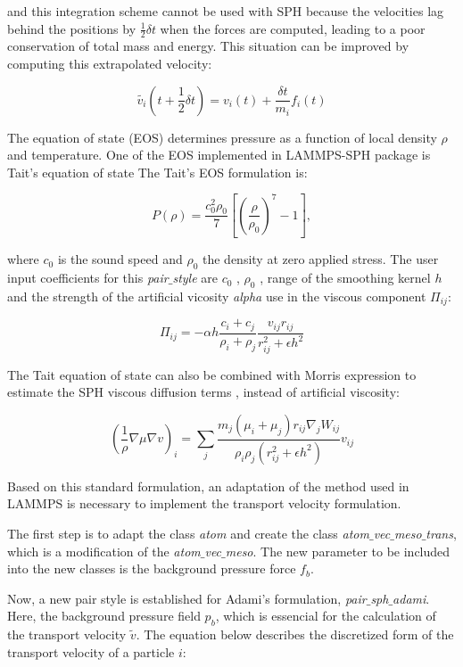 and this integration scheme cannot be used with SPH because the velocities lag behind the positions by $\frac{1}{2}\delta t$ when the forces are computed, leading to a poor conservation
of total mass and energy. This situation can be improved by computing this extrapolated velocity:
  
\begin{equation}
\tilde {v_{i}}(t+\frac{1}{2}\delta t) = v_{i}(t) + \frac{\delta t}{m_{i}} f_{i}(t)
\end{equation}

The equation of state (EOS) determines pressure as a function of local density $\rho$ and temperature. One of the EOS implemented in LAMMPS-SPH package is Tait's equation of state
The Tait's EOS formulation is:

  
\begin{equation}
P(\rho) = \frac{c_{0}^2 \rho_{0}}{7}\left[\left(\frac{\rho}{\rho_{0}}\right)^7 - 1 \right] , 
\end{equation}

where $c_{0}$ is the sound speed and $\rho_{0}$ the density at zero applied stress. The user input coefficients for this \textit{pair$\_$style} are $c_{0}$ , $\rho_{0}$ , range of the
smoothing  kernel $h$ and the strength of the artificial vicosity \textit{alpha} use in the viscous component $\Pi_{ij}$:

\begin{equation}
\Pi_{ij} = -\alpha h \frac{c_{i}+c_{j}}{\rho_{i}+\rho_{j}} \frac{v_{ij}r_{ij}}{r^2_{ij}+\epsilon h^2}
\end{equation}

The Tait equation of state can also be combined with Morris expression to estimate the SPH viscous diffusion terms \cite{morris_switch_1997}, instead of artificial viscosity:

\begin{equation}
\left(\frac{1}{\rho}\nabla  \mu \nabla v \right)_{i} = \sum_{j} \frac{m_{j}(\mu_{i}+\mu_{j})r_{ij}\nabla_{j}W_{ij}}{\rho_{i}\rho_{j}(r^2_{ij}+\epsilon h^2)} v_{ij}
\end{equation}

Based on this standard formulation, an adaptation of the method used in LAMMPS is necessary to implement the transport velocity formulation.\par

The first step is to adapt the class \textit{atom} and create the class \textit{atom$\_$vec$\_$meso$\_$trans}, which is a modification of the \textit{atom$\_$vec$\_$meso}. The new 
parameter to be included into the new classes is the background pressure force $f_{b}$. \par
Now, a new pair style is established for Adami's formulation, \textit{pair$\_$sph$\_$adami}. Here, the background pressure field $p_{b}$, which is essencial for the calculation
of the transport velocity $\tilde{v}$. The equation below describes the discretized form of the transport velocity of a particle $i$:

